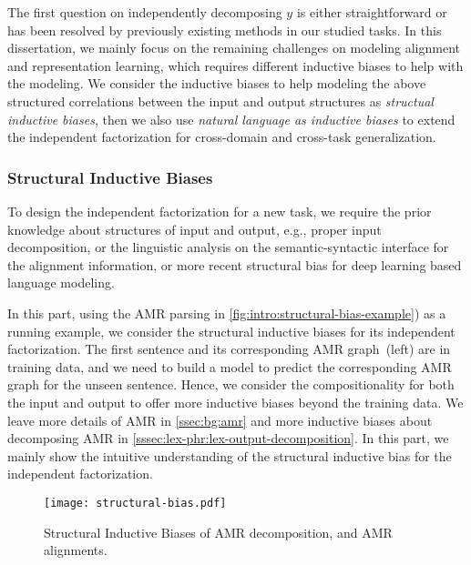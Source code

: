 {The first question on independently decomposing $y$ is either
straightforward or has been resolved by previously existing methods in
our studied tasks. In this dissertation, we mainly focus on the remaining
challenges on modeling alignment and representation learning, which
requires different inductive biases to help with the
modeling. We consider the inductive biases to
help modeling the above structured correlations between the input and
output structures as \emph{structual inductive biases}, then we also
use \emph{natural language as inductive biases} to extend the
independent factorization for cross-domain and cross-task
generalization.

\subsubsection{Structural Inductive Biases}
\label{sssec:intro:structural-biases}
To design the independent factorization for a new task, we require the
prior knowledge about structures of input and output, e.g., proper
input decomposition, or the linguistic analysis on the
semantic-syntactic interface for the alignment information, or more
recent structural bias for deep learning based language modeling.

In this part, using the AMR parsing in
\autoref{fig:intro:structural-bias-example}) as a running example, we
consider the structural inductive biases for its independent
factorization. The first sentence and its corresponding AMR
graph~(left) are in training data, and we need to build a model to
predict the corresponding AMR graph for the unseen sentence. Hence, we
consider the compositionality for both the input and output to offer
more inductive biases beyond the training data. We leave more details
of AMR in \autoref{ssec:bg:amr} and more inductive biases about
decomposing AMR in
\autoref{sssec:lex-phr:lex-output-decomposition}. In this part, we
mainly show the intuitive understanding of the structural inductive
bias for the independent factorization.

\begin{figure}[!th]
  \centering
  \texttt{[image: structural-bias.pdf]}
  \caption{\label{fig:intro:structural-bias-example} Structural Inductive
    Biases of AMR decomposition, and AMR alignments.}
\end{figure}

}
